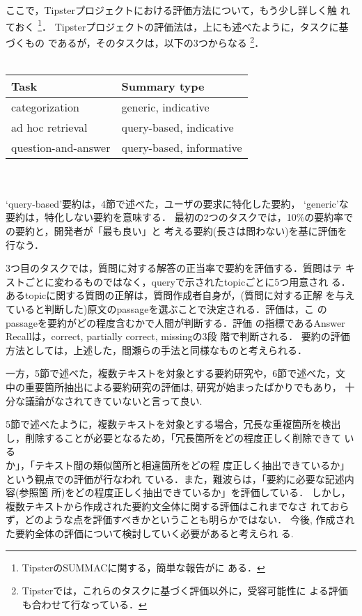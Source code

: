 ここで，Tipsterプロジェクトにおける評価方法について，もう少し詳しく触
れておく
\footnote{TipsterのSUMMACに関する，簡単な報告が\cite{fukumoto:98:a}に
ある．}．
Tipsterプロジェクトの評価法は，上にも述べたように，タスクに基づくもの
であるが，そのタスクは，以下の3つからなる
\footnote{Tipsterでは，これらのタスクに基づく評価以外に，受容可能性に
よる評価も合わせて行なっている．}．\\
　\\
\begin{tabular}{ll}
Task & Summary type\\ \hline
categorization & generic, indicative\\
ad hoc retrieval & query-based, indicative\\
question-and-answer & query-based, informative\\
\end{tabular}\\　\\
`query-based'要約は，4節で述べた，ユーザの要求に特化した要約，
`generic'な要約は，特化しない要約を意味する．
最初の2つのタスクでは，10\%の要約率での要約と，開発者が「最も良い」と
考える要約(長さは問わない)を基に評価を行なう．

3つ目のタスクでは，質問に対する解答の正当率で要約を評価する．質問はテ
キストごとに変わるものではなく，queryで示されたtopicごとに5つ用意され
る．あるtopicに関する質問の正解は，質問作成者自身が，(質問に対する正解
を与えていると判断した)原文のpassageを選ぶことで決定される．評価は，こ
のpassageを要約がどの程度含むかで人間が判断する．評価
の指標であるAnswer Recallは，correct, partially correct, missingの3段
階で判断される．
要約の評価方法としては，上述した，間瀬らの手法と同様なものと考えられる．

一方，5節で述べた，複数テキストを対象とする要約研究や，6節で述べた，文
中の重要箇所抽出による要約研究の評価は, 研究が始まったばかりでもあり，
十分な議論がなされてきていないと言って良い. 

5節で述べたように，複数テキストを対象とする場合，冗長な重複箇所を検出
し，削除することが必要となるため，「冗長箇所をどの程度正しく削除できて
いるか」\cite{funasaka:96:a}，「テキスト間の類似箇所と相違箇所をどの程
度正しく抽出できているか」\cite{mani:97:a}という観点での評価が行なわれ
ている．また，難波ら\cite{nanba:99:a}は，「要約に必要な記述内容(参照箇
所)をどの程度正しく抽出できているか」を評価している．
しかし，複数テキストから作成された要約文全体に関する評価はこれまでなさ
れておらず，どのような点を評価すべきかということも明らかではない．
今後, 作成された要約全体の評価について検討していく必要があると考えられ
る.

